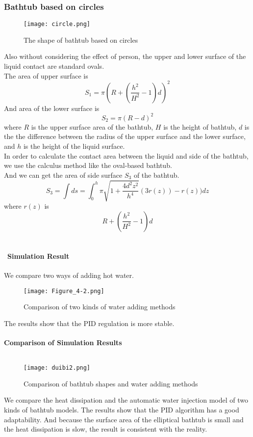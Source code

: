 \documentclass{mcmthesis}
\begin{document}
\subsubsection{Bathtub based on circles}
\begin{figure}[H]
\centerline{\texttt{[image: circle.png]}}
\caption{The shape of bathtub based on circles}
\label{circle}	
\end{figure}
\indent Also without considering the effect of person, the upper and lower surface of the liquid contact are standard ovals.\\
\indent The area of upper surface is\\
\begin{equation}
S_{1}=\pi (R+(\frac{h^{2}}{H^{2}}-1)d)^{2}
\end{equation}
\indent And area of the lower surface is\\
\begin{equation}
S_{2}=\pi (R-d)^{2}
\end{equation}
\indent where $R$ is the upper surface area of the bathtub, $H$ is the height of bathtub, $d$ is the the difference between the radius of the upper surface and the lower surface, and $h$ is the height of the liquid surface.\\ 
\indent In order to calculate the contact area between the liquid and side of the bathtub, we use the calculus method like the oval-based bathtub.\\
And we can get the area of side surface $S_{3}$ of the bathtub.
\begin{equation}
	S_{3}=\int ds=\int_{0}^{h}\pi \sqrt{1+\frac{4d^{2}z^{2}}{h^{4}}}({3}r(z))-r(z))dz
\end{equation}
\indent where $r(z)$ is
\begin{equation}
	R+(\frac{h^{2}}{H^{2}}-1)d
\end{equation}
\\\\
\noindent\
\textbf{Simulation Result}\\\\
\indent We compare two ways of adding hot water.   
\begin{figure}[H]
	\centerline{\texttt{[image: Figure\_4-2.png]}}
	\caption{Comparison of two kinds of water adding methods}
	\label{circle}	
\end{figure}
The results show that the PID regulation is more stable.\\\\
\noindent
\textbf{Comparison of Simulation Results}\\\\
\begin{figure}[H]
	\centerline{\texttt{[image: duibi2.png]}}
	\caption{Comparison of bathtub shapes and water adding methods}
	\label{circle}	
\end{figure}
\indent We compare the heat dissipation and the automatic water injection model of two kinds of bathtub models. The results show that the PID algorithm has a good adaptability. And because the surface area of the elliptical bathtub is small and the heat dissipation is slow, the result is consistent with the reality.
\end{document}
